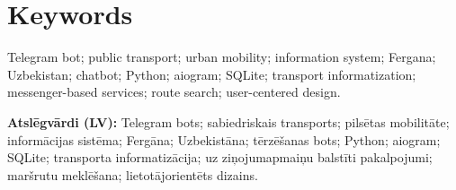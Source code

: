 \section*{Keywords}

Telegram bot; public transport; urban mobility; information system;
Fergana; Uzbekistan; chatbot; Python; aiogram; SQLite; transport
informatization; messenger-based services; route search; user-centered
design.

\vspace{1em}

\noindent\textbf{Atslēgvārdi (LV):} Telegram bots; sabiedriskais transports;
pilsētas mobilitāte; informācijas sistēma; Fergāna; Uzbekistāna; tērzēšanas
bots; Python; aiogram; SQLite; transporta informatizācija; uz ziņojumapmaiņu
balstīti pakalpojumi; maršrutu meklēšana; lietotājorientēts dizains.
\newpage
